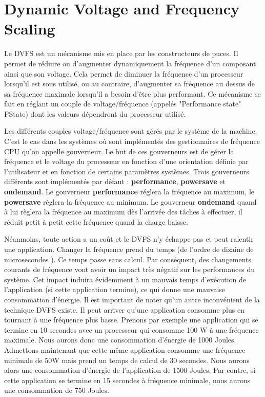 \section{Dynamic Voltage and Frequency Scaling}
\label{DVFS}
\begin{onehalfspace}
Le DVFS est un mécanisme mis en place par les constructeurs de puces. Il permet de réduire ou d’augmenter dynamiquement la fréquence d’un composant ainsi que son voltage. Cela permet de diminuer la fréquence d’un processeur lorsqu’il est sous utilisé, ou au contraire, d’augmenter sa fréquence au dessus de sa fréquence maximale  lorsqu’il a besoin d’être plus performant. Ce mécanisme se fait en réglant un couple de voltage/fréquence (appelés "Performance state" PState) dont les valeurs dépendront du processeur utilisé.\medskip

Les différents couples voltage/fréquence sont gérés par le système de la machine. C’est le cas dans les systèmes où sont implémentés des gestionnaires de fréquence CPU qu'on appelle gouverneur. Le but de ces gouverneurs  est de gérer la fréquence et le voltage du processeur en fonction d’une orientation définie par l’utilisateur et en fonction de certains paramètres systèmes. Trois gouverneurs différents sont implémentés par défaut : \textbf{performance}, \textbf{powersave} et \textbf{ondemand}. Le gouverneur \textbf{performance} réglera la fréquence au maximum, le \textbf{powersave} règlera la fréquence au minimum. Le gouverneur \textbf{ondemand} quand à lui règlera la fréquence au maximum dès l’arrivée des tâches à effectuer, il réduit  petit à petit cette fréquence quand la charge baisse.\medskip 

Néanmoins, toute action a un coût et le DVFS n’y échappe pas et peut ralentir une  application. Changer la fréquence prend du temps (de l’ordre de dizaine de microsecondes \cite{ref10}). Ce temps passe sans calcul. Par conséquent, des changements courants de fréquence vont avoir un impact très négatif sur les performances du système. Cet impact induira évidemment à un mauvais temps d’exécution de l’application (si cette application termine), ce qui donne une mauvaise consommation d’énergie. Il est important de noter qu’un autre inconvénient de la technique DVFS existe. Il peut arriver qu’une application consomme plus en tournant à une fréquence plus basse. Prenons par exemple une application qui se termine en 10 secondes avec un processeur qui consomme 100 W à une fréquence maximale. Nous aurons donc une consommation d’énergie de 1000 Joules. Admettons maintenant que cette même application consomme une fréquence minimale  de 50W mais prend  un temps de calcul de 30 secondes. Nous aurons alors une consommation d’énergie de l’application de 1500 Joules. Par contre, si cette application se termine en 15 secondes à fréquence minimale, nous aurons une consommation de 750 Joules.\medskip 


\end{onehalfspace}
